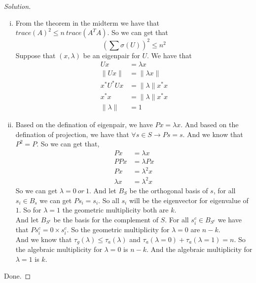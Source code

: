 \documentclass[a4paper]{article}
\newenvironment{solution}
  {\renewcommand\qedsymbol{$\blacksquare$}\begin{proof}[Solution]}
  {\end{proof}}
\begin{document}
\begin{description}
  \begin{solution}\
    \begin{enumerate}[i)]
      \item From the theorem in the midterm we have that $trace(A)^{2}\le n\ trace(A^{T}A)$. So we can get that $$(\sum \sigma(U))^{2}\le n^{2}$$
      Suppose that $(x,\lambda)$ be an eigenpair for $U$. We have that
      \begin{align*}
        Ux&=\lambda x\\
        \|Ux\|&=\|\lambda x\|\\
        x^{\ast}U^{\ast}Ux&=\|\lambda\|x^{\ast}x\\
        x^{\ast}x&=\|\lambda\| x^{\ast}x\\
        \|\lambda\|&=1
      \end{align*}
      \item Based on the defination of eigenpair, we have $Px=\lambda x$. And based on the defination of projection, we have that $\forall s\in S\to Ps=s$. And we know that $P^{2}=P$.
      So we can get that,
      \begin{align*}
        Px&=\lambda x\\
        PPx&=\lambda Px\\
        Px&=\lambda^{2}x\\
        \lambda x&=\lambda^{2}x
      \end{align*}
      So we can get $\lambda =0 \ or \ 1$. And let $B_{S}$ be the orthogonal basis of $s$, for all $s_{i}\in B_{s}$ we can get $Ps_{i}=s_{i}$. So all $s_{i}$ will be the eigenvector for eigenvalue of $1$. So for $\lambda=1$ the geometric multiplicity both are $k$. \\
      And let $B_{S^{c}}$ be the basis for the complement of $S$. For all $s_{i}^{c}\in B_{S^{c}}$ we have that $Ps_{i}^{c}=0\times s_{i}^{c}$. So the geometric multiplicity for $\lambda=0$ are $n-k$.\\
      And we know that $\tau_{g}(\lambda)\le\tau_{a}(\lambda)$ and $\tau_{a}(\lambda=0)+\tau_{a}(\lambda=1)=n$. So the algebraic multiplicity for $\lambda=0$ is $n-k$. And the algebraic multiplicity for $\lambda=1$ is $k$.
     \end{enumerate}
    Done.
  \end{solution}

\end{description}
\end{document}
